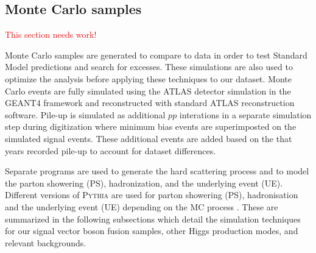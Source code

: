 \subsection{Monte Carlo samples}
\textcolor{red}{This section needs work!}


Monte Carlo samples are generated to compare to data in order to test Standard Model predictions and search for excesses. These simulations are also used to optimize the analysis before applying these techniques to our dataset. Monte Carlo events are fully simulated using the ATLAS detector simulation in the GEANT4 framework \cite{GEANT4} and reconstructed with standard ATLAS reconstruction software. Pile-up is simulated as additional $pp$ interations in a separate simulation step during digitization where minimum bias events are superimposted on the simulated signal events. These additional events are added based on the that years recorded pile-up to account for dataset differences. 

Separate programs are used to generate the hard scattering process and to model the parton showering (PS), hadronization, and the underlying event (UE). Different versions of \textsc{Pythia} are used for parton showering (PS), hadronisation and the underlying event (UE) depending on the MC process \cite{pythia8}. These are summarized in the following subsections which detail the simulation techniques for our signal vector boson fusion samples, other Higgs production modes, and relevant backgrounds.   



